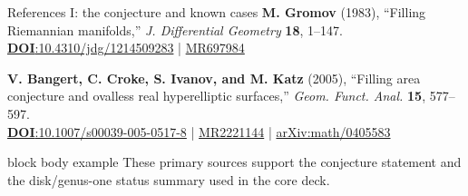 \documentclass[11pt,aspectratio=169,usepdftitle=false]{beamer}
\begin{document}
\begin{frame}{References I: the conjecture and known cases}\label{bk:refs1}
  \footnotesize
  \textbf{M. Gromov} (1983), ``Filling Riemannian manifolds,''
  \emph{J. Differential Geometry} \textbf{18}, 1--147.\\[-0.15em]
  \href{https://doi.org/10.4310/jdg/1214509283}{\textbf{DOI}:10.4310/jdg/1214509283}
  \;|\;
  \href{https://mathscinet.ams.org/mathscinet-getitem?mr=697984}{MR697984}

  \vspace{0.62cm}
  \textbf{V. Bangert, C. Croke, S. Ivanov, and M. Katz} (2005),
  ``Filling area conjecture and ovalless real hyperelliptic surfaces,''
  \emph{Geom. Funct. Anal.} \textbf{15}, 577--597.\\[-0.15em]
  \href{https://doi.org/10.1007/s00039-005-0517-8}{\textbf{DOI}:10.1007/s00039-005-0517-8}
  \;|\;
  \href{https://mathscinet.ams.org/mathscinet-getitem?mr=2221144}{MR2221144}
  \;|\;
  \href{https://arxiv.org/abs/math/0405583}{arXiv:math/0405583}

  \vspace{0.65cm}
  \begin{beamercolorbox}[rounded=true,sep=0.5em]{block body example}
    These primary sources support the conjecture statement and the disk/genus-one
    status summary used in the core deck.
  \end{beamercolorbox}
\end{frame}
\end{document}
